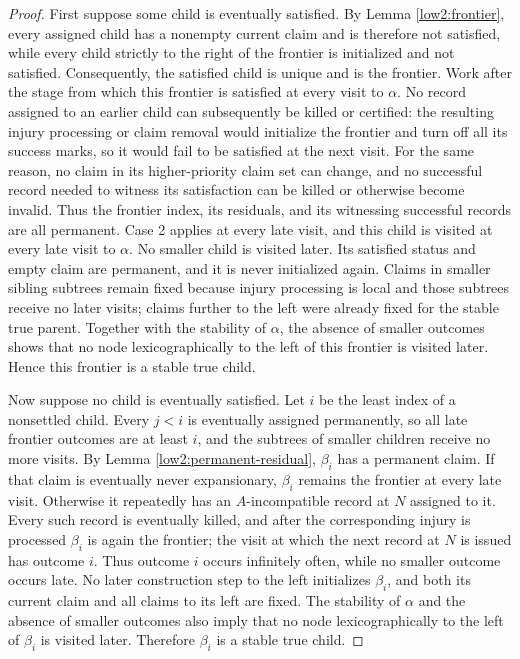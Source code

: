 \documentclass[11pt]{amsart}
\begin{document}
\begin{proof}
First suppose some child is eventually satisfied. By Lemma
\ref{low2:frontier}, every assigned child has a nonempty current claim and is
therefore not satisfied, while every child strictly to the right of the
frontier is initialized and not satisfied. Consequently, the satisfied child
is unique and is the frontier.
Work after the stage from which this frontier is satisfied at every visit to
$\alpha$. No record assigned to an earlier child can subsequently be killed
or certified: the resulting injury processing or claim removal would
initialize the frontier and turn off all its success marks, so it would fail
to be satisfied at the next visit. For the same reason, no claim in its
higher-priority claim set can change, and no successful record needed to
witness its satisfaction can be killed or otherwise become invalid. Thus the
frontier index, its residuals, and its witnessing successful records are all
permanent. Case 2 applies at every late visit,
and this child is visited at every late visit to $\alpha$. No smaller child
is visited later. Its satisfied status and empty claim are permanent, and it
is never initialized again. Claims in smaller sibling subtrees remain fixed
because injury processing is local and those subtrees receive no later
visits; claims further to the left were already fixed for the stable true
parent. Together with the stability of $\alpha$, the absence of smaller
outcomes shows that no node lexicographically to the left of this frontier is
visited later. Hence this frontier is a stable true child.

Now suppose no child is eventually satisfied. Let $i$ be the least index of a
nonsettled child. Every $j<i$ is eventually assigned permanently, so all late
frontier outcomes are at least $i$, and the subtrees of smaller children
receive no more visits. By Lemma \ref{low2:permanent-residual}, $\beta_i$ has
a permanent claim. If that claim is eventually never expansionary,
$\beta_i$ remains the frontier at every late visit. Otherwise it repeatedly
has an $A$-incompatible record at $N$ assigned to it. Every such record is eventually killed,
and after the corresponding injury is processed $\beta_i$ is again the
frontier; the visit at which the next record at $N$ is issued has outcome $i$.
Thus outcome $i$ occurs infinitely often, while no smaller outcome occurs
late. No later construction step to the left initializes $\beta_i$, and both
its current claim and all claims to its left are fixed.
The stability of $\alpha$ and the absence of smaller outcomes also imply that
no node lexicographically to the left of $\beta_i$ is visited later.
Therefore $\beta_i$ is a stable true child.
\end{proof}
\end{document}
